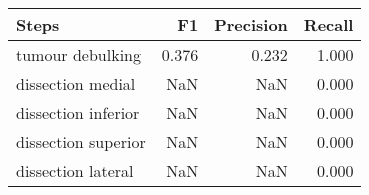 \begin{tabular}{lrrr}
\toprule
Steps & F1 & Precision & Recall \\
\midrule
tumour debulking & 0.376 & 0.232 & 1.000 \\
dissection medial & NaN & NaN & 0.000 \\
dissection inferior & NaN & NaN & 0.000 \\
dissection superior & NaN & NaN & 0.000 \\
dissection lateral & NaN & NaN & 0.000 \\
\bottomrule
\end{tabular}
